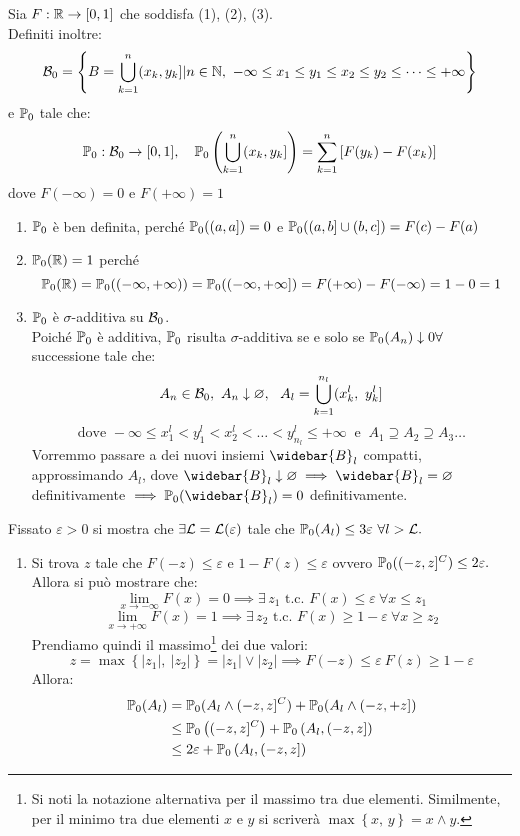 \begin{dimo}
  Sia $ F: \mathbb R \to [0,1]$ che soddisfa (1), (2), (3).\\
  Definiti inoltre:
  $$\mathcal B_0 = \left \{ B= \bigcup_{k=1}^n (x_k, y_k] | n \in \mathbb N, \ -\infty \le x_1 \le y_1 \le x_2 \le y_2 \le \dots \le +\infty \right \}$$
  e $\mathbb P_0$ tale che:
  $$\mathbb P_0: \mathcal B_0 \to [0,1], \quad \mathbb P_0 \left( \bigcup_{k=1}^n ( x_k, y_k ] \right) = \sum_{k=1}^{n} \left[ F(y_k) - F(x_k) \right]$$
  dove $F(-\infty)=0$ e $F(+\infty)=1$
  \begin{enumerate}   \renewcommand{\labelenumi}{\alph{enumi})}
    \item $\mathbb P_0$ è ben definita, perché $\mathbb P_0( ( a, a] )= 0$ e $ \mathbb P_0( (a, b] \cup (b, c] ) = F(c) -F(a)$
    \item $\mathbb P_0 (\mathbb R) =1$ perché
        $$\mathbb P_0( \mathbb R) = \mathbb P_0( (-\infty, +\infty) )= \mathbb P_0 ( (-\infty, +\infty] )= F({+\infty}) - F(-\infty) = 1-0=1$$
    \item $\mathbb P_0$ è $\sigma$-additiva su $\mathcal B_0$.\\
        Poiché $\mathbb P_0$ è additiva, $\mathbb P_0$ risulta $\sigma$-additiva se e solo se $\mathbb P_0(A_n) \downarrow 0 \forall$ successione tale che:
        $$A_n \in \mathcal B_0, \ A_n \downarrow \varnothing, \ \ A_l = \bigcup_{k=1}^{n_l} ( x_k^l, \ y_k^l]$$
        $$\text{dove } -\infty \le x_1^l < y_1^l < x_2^l < \dots < y_{n_l}^l \le +\infty \ \text{ e } \ A_1 \supseteq A_2 \supseteq A_3 \dots$$
        Vorremmo passare a dei nuovi insiemi $\widebar{B}_l$ compatti, approssimando $A_l$, dove $\widebar{B}_l \downarrow \varnothing \implies \widebar{B}_l = \varnothing$ definitivamente $\implies \PP_0( \widebar{B}_l)=0$ definitivamente.
  \end{enumerate}
  Fissato $\varepsilon >0 $ si mostra che $\exists \mathcal L = \mathcal L (\varepsilon)$ tale che $ \mathbb P_0(A_l) \le 3 \varepsilon \ \forall l > \mathcal L.$\\
  \begin{enumerate}
    \item Si trova $z$ tale che $F(-z) \le \varepsilon$ e $1-F(z) \le \varepsilon$ ovvero $\mathbb P_0( (-z, z]^C ) \le 2 \varepsilon.$\\
      Allora si può mostrare che:
      $$
      \lim_{x \to -\infty} F(x) =0 \implies \exists \, z_1 \text{ t.c. } F(x) \le \varepsilon \ \forall x \le z_1
      $$
      $$
      \lim_{x \to +\infty} F(x) =1 \implies \exists \, z_2  \text{ t.c. } F(x) \ge 1 - \varepsilon \ \forall x \ge z_2$$
      Prendiamo quindi il massimo\footnote{Si noti la notazione alternativa per il massimo tra due elementi. Similmente, per il minimo tra due elementi $x$ e $y$ si scriverà $\max \left \{ x, \, y \right \} = x \land y$.} dei due valori:
      $$z= \max \left \{ |z_1|, \ |z_2| \right \} = |z_1| \lor |z_2| \implies F(-z) \le \varepsilon \ F(z) \ge 1 - \varepsilon$$
      Allora:
      \begin{align*}
        \mathbb P_0(A_l) &= \mathbb P_0( A_l \land (-z, z]^C ) + \mathbb P_0( A_l \land (-z, +z] ) \\
        &\le \mathbb P_0 \left( (-z, z]^C \right) + \mathbb P_0 \left( A_l, (-z,z] \right) \\
        &\le 2 \varepsilon + \mathbb P_0 \left( A_l, (-z,z] \right)
      \end{align*}


\end{enumerate}
\end{dimo}
